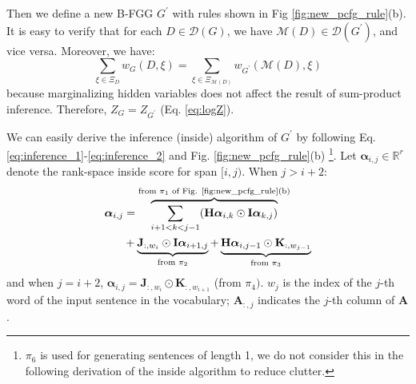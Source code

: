 \documentclass[11pt]{article}
\newcommand{\vect}[1]{\boldsymbol{\mathbf{#1}}}
\begin{document}
Then we define a new B-FGG $G^{\prime}$ with rules shown in Fig \ref{fig:new_pcfg_rule}(b). It is easy to verify that for each $D \in \mathcal{D}(G)$, we have $\mathcal{M}(D) \in \mathcal{D}(G^{\prime})$, and vice versa.  Moreover, we have: \[ \sum_{\xi \in \Xi_{D}} w_{G}(D, \xi) = \sum_{\xi \in \Xi_{\mathcal{M}(D)}} w_{G^{\prime}}(\mathcal{M}(D), \xi)\] 
because marginalizing hidden variables does not affect the result of sum-product inference. Therefore,  $Z_G = Z_{G^{\prime}}$ (Eq. \ref{eq:logZ}).

We can easily derive the inference (inside) algorithm of $G^{\prime}$ by following Eq. \ref{eq:inference_1}-\ref{eq:inference_2} and Fig. \ref{fig:new_pcfg_rule}(b) \footnote{$\pi_6$ is used for generating sentences of length 1, we do not consider this in the following derivation of the inside algorithm to reduce clutter.}. Let $\vect{\alpha}_{i, j}\in \mathbb{R}^{r}$ denote the rank-space inside score for span $[i,j)$. When $j>i+2$:
\begin{align*}
\vect{\alpha}_{i, j} &= \overbrace{\sum_{i+1<k<j-1} (\vect{H} \vect{\alpha}_{i, k} \odot \vect{I}\vect{\alpha}_{k, j})}^{\text{from $\pi_{1}$ of Fig. \ref{fig:new_pcfg_rule}(b)}}  \\
                    & + \underbrace{\vect{J}_{:,w_{i}} \odot \vect{I} \vect{\alpha}_{i+1, j}}_{\text{from $\pi_{2}$}} + \underbrace{\vect{H}\vect{\alpha}_{i, j-1} \odot \vect{K}_{:,w_{j-1}}}_{\text{from $\pi_{3}$}}
\end{align*}
and when $j = i+2$, $\vect{\alpha}_{i, j} = \vect{J}_{:,w_{i}} \odot \vect{K}_{:,w_{i+1}}$ (from $\pi_{4})$. $w_j$ is the index of the $j$-th word of the input sentence in the vocabulary; $\vect{A}_{:,j}$ indicates the $j$-th column of $\vect{A}$.
\end{document}
